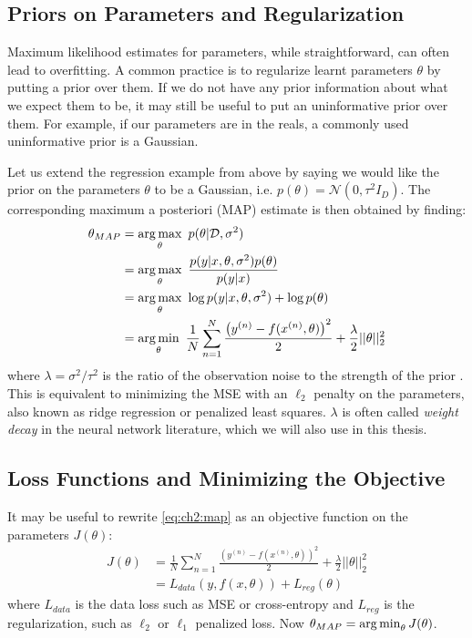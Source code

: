 \subsection{Priors on Parameters and Regularization}
  Maximum likelihood estimates for parameters, while straightforward, can often
  lead to overfitting. A common practice is to regularize learnt parameters
  $\theta$ by putting a prior over them. If we do not have any prior information
  about what we expect them to be, it may still be useful to put an
  uninformative prior over them. For example, if our parameters are in the
  reals, a commonly used uninformative prior is a Gaussian.

  Let us extend the regression example from above by saying we would like the
  prior on the parameters $\theta$ to be a Gaussian, i.e.
  $p(\theta) = \mathcal{N}(0, \tau^2I_D)$. The corresponding maximum a posteriori
  (MAP) estimate is then obtained by finding:
  \begin{align}\label{eq:ch2:map}
    \theta_{MAP} &= \operatorname*{arg\,max}_\theta\ p(\theta | \mathcal{D}, \sigma^2) \\
                 &= \operatorname*{arg\,max}_\theta\ \frac{p(y| x, \theta, \sigma^2) p(\theta)}{p(y|x)} \\
                 &= \operatorname*{arg\,max}_\theta\ \log p(y|x, \theta, \sigma^2) + \log p(\theta) \\
                 &= \operatorname*{arg\,min}_{\theta}\ \frac{1}{N}\sum_{n=1}^{N} \frac{\left(y^{(n)} - f(x^{(n)}, \theta)\right)^2}{2} +
      \frac{\lambda}{2} ||\theta||_2^2
  \end{align}
  where $\lambda = \sigma^2/\tau^2$ is the ratio of the observation noise to the
  strength of the prior \cite[Chapter~7]{murphy_machine_2012}. This is
  equivalent to minimizing the MSE with an $\ell_2$ penalty on the parameters,
  also known as ridge regression or penalized least squares.
  $\lambda$ is often called \emph{weight decay} in the neural network
  literature, which we will also use in this thesis.

\subsection{Loss Functions and Minimizing the Objective}
  It may be useful to rewrite \eqref{eq:ch2:map} as an objective function on the
  parameters $J(\theta)$:
  \begin{align}
    J(\theta) &=\frac{1}{N}\sum_{n=1}^{N} \frac{\left(y^{(n)} - f(x^{(n)}, \theta)\right)^2}{2} +
                  \frac{\lambda}{2} ||\theta||_2^2 \label{eq:ch2:regression_ob} \\
              &= L_{data}(y, f(x, \theta)) + L_{reg}(\theta) \label{eq:ch2:objective}
  \end{align}
  where $L_{data}$ is the data loss such as MSE or cross-entropy and
  $L_{reg}$ is the regularization, such as $\ell_2$ or $\ell_1$ penalized loss.
  Now $\theta_{MAP} = \operatorname*{arg\,min}_\theta J(\theta)$.

